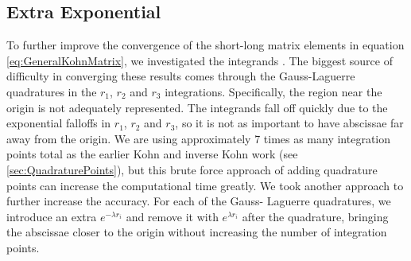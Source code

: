 \documentclass[Dissertation.tex]{subfiles}
\begin{document}
%
%


\subsection{Extra Exponential}
\label{sec:ExtraExp}
To further improve the convergence of the short-long matrix elements in 
equation \cref{eq:GeneralKohnMatrix}, we investigated the integrands
\cite{VanReethPrivate}. The biggest source of 
difficulty in converging these results comes through the Gauss-Laguerre 
quadratures in the $r_1$, $r_2$ and $r_3$ integrations. Specifically, the 
region near the origin is not adequately represented. The integrands fall off 
quickly due to the exponential falloffs in $r_1$, $r_2$ and $r_3$, so it is 
not as important to have abscissae far away from the origin.
We are using approximately 7 times as many integration points total as the
earlier Kohn and inverse Kohn work \cite{VanReeth2003,VanReeth2004}
(see \cref{sec:QuadraturePoints}), but this brute force approach of adding 
quadrature points can increase the computational time greatly. We took 
another approach to further increase the accuracy. For each of the Gauss-
Laguerre quadratures, we introduce an extra $e^{-\lambda r_i}$ and remove it 
with $e^{\lambda r_i}$ after the quadrature, bringing the abscissae closer to 
the origin without increasing the number of integration points.
\end{document}
